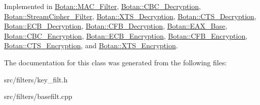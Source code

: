 Implemented in \hyperlink{classBotan_1_1MAC__Filter_ab500e8c6e8d020634fae9f993ee58d7a}{Botan\-::\-M\-A\-C\-\_\-\-Filter}, \hyperlink{classBotan_1_1CBC__Decryption_ad233ce4905980b91f098269b177f7468}{Botan\-::\-C\-B\-C\-\_\-\-Decryption}, \hyperlink{classBotan_1_1StreamCipher__Filter_ad1c94c9803467ed412dd4e0fe7c7fd4d}{Botan\-::\-Stream\-Cipher\-\_\-\-Filter}, \hyperlink{classBotan_1_1XTS__Decryption_a72ef64b8e4c3fe4061de285d53bcb238}{Botan\-::\-X\-T\-S\-\_\-\-Decryption}, \hyperlink{classBotan_1_1CTS__Decryption_adbe0dccb48e6d0f30550e1174b136d3f}{Botan\-::\-C\-T\-S\-\_\-\-Decryption}, \hyperlink{classBotan_1_1ECB__Decryption_a303d73a84d84369924b802a7dadd1e38}{Botan\-::\-E\-C\-B\-\_\-\-Decryption}, \hyperlink{classBotan_1_1CFB__Decryption_a98250ca8d2731a3b3ebee7222467caae}{Botan\-::\-C\-F\-B\-\_\-\-Decryption}, \hyperlink{classBotan_1_1EAX__Base_ac1a6bd5b1a98439eca75b726ea8750fd}{Botan\-::\-E\-A\-X\-\_\-\-Base}, \hyperlink{classBotan_1_1CBC__Encryption_af85353cf52cf74d6a8991ec6391a9f45}{Botan\-::\-C\-B\-C\-\_\-\-Encryption}, \hyperlink{classBotan_1_1ECB__Encryption_adc074a88817943bc92696877dce342ae}{Botan\-::\-E\-C\-B\-\_\-\-Encryption}, \hyperlink{classBotan_1_1CFB__Encryption_aa78b4c58c2ae9967aec8301be9310225}{Botan\-::\-C\-F\-B\-\_\-\-Encryption}, \hyperlink{classBotan_1_1CTS__Encryption_afce0586d81b2906785473da6c53d86c8}{Botan\-::\-C\-T\-S\-\_\-\-Encryption}, and \hyperlink{classBotan_1_1XTS__Encryption_aa0b627b0ee906134de88278968b49482}{Botan\-::\-X\-T\-S\-\_\-\-Encryption}.



The documentation for this class was generated from the following files\-:\begin{DoxyCompactItemize}
\item 
src/filters/key\-\_\-filt.\-h\item 
src/filters/basefilt.\-cpp\end{DoxyCompactItemize}
